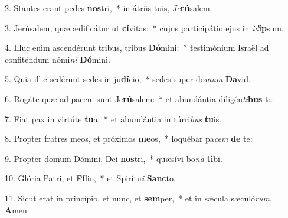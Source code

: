 2. Stantes erant pedes \textbf{nos}tri,~*  in átriis tuis, \textit{Je}\textbf{rú}salem.\

3. Jerúsalem, quæ ædificátur ut \textbf{cí}vitas:~*  cujus participátio ejus in \textit{id}\textbf{íp}sum.\

4. Illuc enim ascendérunt tribus, tribus \textbf{Dó}mini:~*  testimónium Israël ad confiténdum nómi\textit{ni} \textbf{Dó}mini.\

5. Quia illic sedérunt sedes in ju\textbf{dí}cio,~*  sedes super do\textit{mum} \textbf{Da}vid.\

6. Rogáte quæ ad pacem sunt Je\textbf{rú}salem:~*  et abundántia diligén\textit{ti}\textbf{bus} te:\

7. Fiat pax in virtúte \textbf{tu}a:~*  et abundántia in túrri\textit{bus} \textbf{tu}is.\

8. Propter fratres meos, et próximos \textbf{me}os,~*  loquébar pa\textit{cem} \textbf{de} te:\

9. Propter domum Dómini, Dei \textbf{nos}tri,~*  quæsívi bo\textit{na} \textbf{ti}bi.\

10. Glória Patri, et \textbf{Fí}lio,~*  et Spirítu\textit{i} \textbf{Sanc}to.\

11. Sicut erat in princípio, et nunc, et \textbf{sem}per,~*  et in sǽcula sæculó\textit{rum}. \textbf{A}men.\

